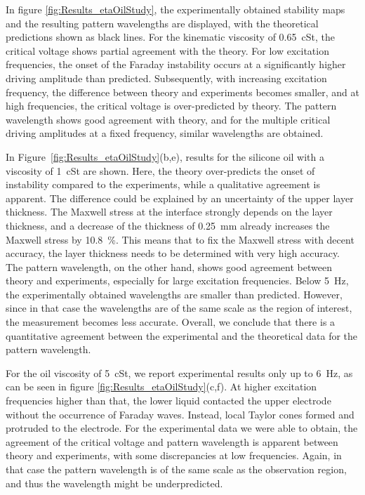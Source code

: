 \documentclass{jfm_arxiv}
\begin{document}
In figure \ref{fig:Results_etaOilStudy}, the experimentally obtained stability maps and the resulting pattern wavelengths are displayed, with the theoretical predictions shown as black lines. For the kinematic viscosity of \SI{0.65}{\centi St}, the critical voltage shows partial agreement with the theory. For low excitation frequencies, the onset of the Faraday instability occurs at a significantly higher driving amplitude than predicted. Subsequently, with increasing excitation frequency, the difference between theory and experiments becomes smaller, and at high frequencies, the critical voltage is over-predicted by theory.
The pattern wavelength shows good agreement with theory, and for the multiple critical driving amplitudes at a fixed frequency, similar wavelengths are obtained. 

In Figure~\ref{fig:Results_etaOilStudy}(b,e), results for the silicone oil with a viscosity of \SI{1}{\centi St} are shown. Here, the theory over-predicts the onset of instability compared to the experiments, while a qualitative agreement is apparent. The difference could be explained by an uncertainty of the upper layer thickness. The Maxwell stress at the interface strongly depends on the layer thickness, and a decrease of the thickness of \SI{0.25}{\milli\meter} already increases the Maxwell stress by \SI{10.8}{\percent}. This means that to fix the Maxwell stress with decent accuracy, the layer thickness needs to be determined with very high accuracy.
The pattern wavelength, on the other hand, shows good agreement between theory and experiments, especially for large excitation frequencies. Below \SI{5}{\hertz}, the experimentally obtained wavelengths are smaller than predicted. However, since in that case the wavelengths are of the same scale as the region of interest, the measurement becomes less accurate. Overall, we conclude that there is a quantitative agreement between the experimental and the theoretical data for the pattern wavelength. 

For the oil viscosity of \SI{5}{\centi St}, we report experimental results only up to \SI{6}{\hertz}, as can be seen in figure \ref{fig:Results_etaOilStudy}(c,f). At higher excitation frequencies higher than that, the lower liquid contacted the upper electrode without the occurrence of Faraday waves. Instead, local Taylor cones formed and protruded to the electrode.
For the experimental data we were able to obtain, the agreement of the critical voltage and pattern wavelength is apparent between theory and experiments, with some discrepancies at low frequencies. Again, in that case the pattern wavelength is of the same scale as the observation region, and thus the wavelength might be underpredicted. 
\end{document}

